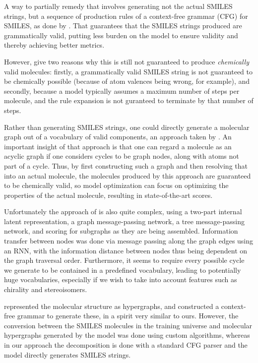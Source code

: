 \documentclass[11pt]{article}
\begin{document}
A way to partially remedy that involves generating not the actual SMILES strings, but a sequence of production rules of a context-free grammar (CFG) for SMILES, as done by \cite{kusner17}. That guarantees that the SMILES strings produced are grammatically valid, putting less burden on the model to ensure validity and thereby achieving better metrics. 

However, \cite{kusner17} give two reasons why this is still not guaranteed to produce \emph{chemically} valid molecules: firstly, a grammatically valid SMILES string is not guaranteed to be chemically possible (because of atom valences being wrong, for example), and secondly, because a model typically assumes a maximum number of steps per molecule, and the rule expansion is not guranteed to terminate by that number of steps. 

Rather than generating SMILES strings, one could directly generate a molecular graph out of a vocabulary of valid components, an approach taken by \cite{jin18}. An important insight of that approach is that one can regard a molecule as an acyclic graph if one considers cycles to be graph nodes, along with atoms not part of a cycle. Thus, by first constructing such a graph and then resolving that into an actual molecule, the molecules produced by this approach are guaranteed to be chemically valid, so model optimization can focus on optimizing the properties of the actual molecule, resulting in state-of-the-art scores.

Unfortunately the approach of \cite{jin18} is also quite complex, using a two-part internal latent representation, a graph message-passing network, a tree message-passing network, and scoring for subgraphs as they are being assembled.  Information transfer between nodes was done via message passing along the graph edges using an RNN, with the information distance between nodes thus being dependent on the graph traversal order. Furthermore, it seems to require every possible cycle we generate to be contained in a predefined vocabulary, leading to potentially huge vocabularies, especially if we wish to take into account features such as chirality and stereoisomers.

\cite{kajino18} represented the molecular structure as hypergraphs, and constructed a context-free grammar to generate these, in a spirit very similar to ours. However, the conversion between the SMILES molecules in the training universe and molecular hypergraphs generated by the model was done using custom algorithms, whereas in our approach the decomposition is done with a standard CFG parser and the model directly generates SMILES strings.
\end{document}
